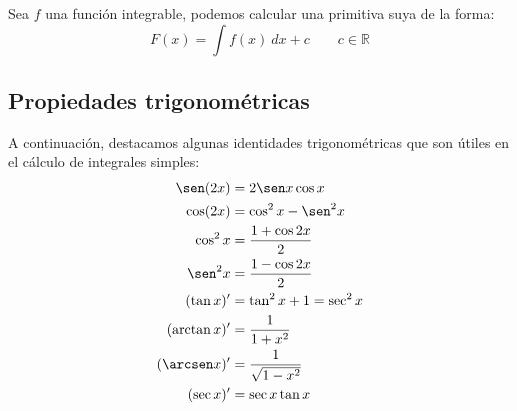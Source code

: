 \begin{prop}
    Sea $f$ una función integrable, podemos calcular una primitiva suya de la forma:
    \begin{equation*}
        F(x) = \int f(x)~dx + c \qquad c\in \mathbb{R}
    \end{equation*}
\end{prop}

\subsection{Propiedades trigonométricas}
A continuación, destacamos algunas identidades trigonométricas que son útiles en el cálculo de integrales simples:
\begin{align*}
    \sen(2x) &= 2\sen x\cos x \\
    \cos(2x) &= \cos^2 x - \sen^2 x \\
    \cos^2 x &= \dfrac{1+\cos 2x}{2} \\
    \sen^2 x &= \frac{1-\cos 2x}{2} \\
    (\tan x)' &= \tan^2 x + 1 = \sec^2 x \\
    (\arctan x)' &= \dfrac{1}{1+x^2} \\
    (\arcsen x)' &= \dfrac{1}{\sqrt{1-x^2}} \\
    (\sec x)' &= \sec x \tan x
\end{align*}

